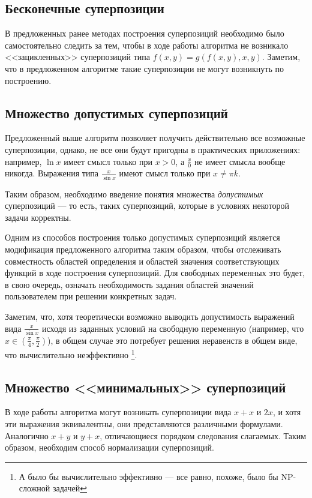 \documentclass[12pt,a4paper]{amsart}
\begin{document}
\subsection{Бесконечные суперпозиции}

В предложенных ранее методах\cite{Zelinka2008} построения суперпозиций
необходимо было самостоятельно следить за тем, чтобы в ходе работы алгоритма
не возникало <<зацикленных>> суперпозиций типа $f(x, y) = g (f(x, y), x, y)$.
Заметим, что в предложенном алгоритме такие суперпозиции не могут возникнуть
по построению.

\subsection{Множество допустимых суперпозиций}

Предложенный выше алгоритм позволяет получить действительно все возможные
суперпозиции, однако, не все они будут пригодны в практических приложениях:
например, $\ln x$ имеет смысл только при $x > 0$, а $\frac{x}{0}$ не имеет
смысла вообще никогда. Выражения типа $\frac{x}{\sin x}$ имеют смысл только
при $x \neq \pi k$.

Таким образом, необходимо введение понятия множества \emph{допустимых}
суперпозиций --- то есть, таких суперпозиций, которые в условиях некоторой
задачи корректны.

Одним из способов построения только допустимых суперпозиций является
модификация предложенного алгоритма таким образом, чтобы отслеживать
совместность областей определения и областей значения соответствующих
функций в ходе построения суперпозиций. Для свободных переменных это будет,
в свою очередь, означать необходимость задания областей значений пользователем
при решении конкретных задач.

Заметим, что, хотя теоретически возможно выводить допустимость выражений
вида $\frac{x}{\sin x}$ исходя из заданных условий на свободную переменную
(например, что $x \in (\frac{\pi}{4}, \frac{\pi}{2})$), в общем случае это
потребует решения неравенств в общем виде, что вычислительно неэффективно
\footnote{А было бы вычислительно эффективно --- все равно, похоже, было бы
NP-сложной задачей}.

\subsection{Множество <<минимальных>> суперпозиций}

В ходе работы алгоритма могут возникать суперпозиции вида $x + x$ и $2x$,
и хотя эти выражения эквивалентны, они представляются различными формулами.
Аналогично $x + y$ и $y + x$, отличающиеся порядком следования слагаемых.
Таким образом, необходим способ нормализации суперпозиций.
\end{document}
